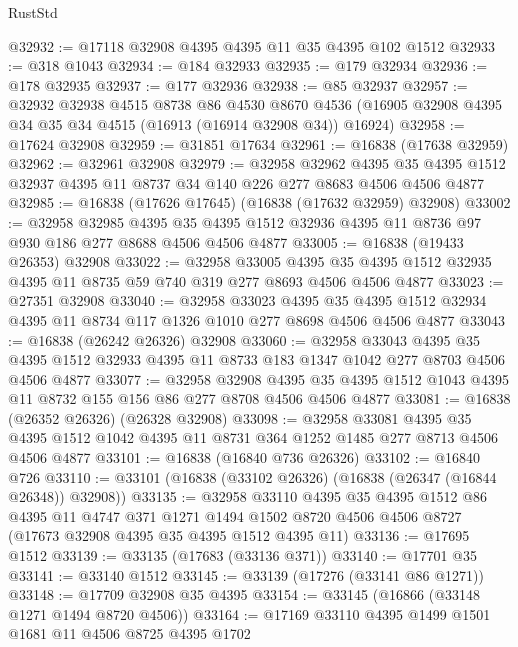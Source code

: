 \begin{lexlean}{RustStd}
\begin{coremodule}
@32932 := @17118 @32908 @4395 @4395 @11 @35 @4395 @102 @1512
@32933 := @318 @1043
@32934 := @184 @32933
@32935 := @179 @32934
@32936 := @178 @32935
@32937 := @177 @32936
@32938 := @85 @32937
@32957 := @32932
    @32938
    @4515
    @8738
    @86
    @4530
    @8670
    @4536
    (@16905 @32908 @4395 @34 @35 @34 @4515 (@16913 (@16914 @32908 @34)) @16924)
@32958 := @17624 @32908
@32959 := @31851 @17634
@32961 := @16838 (@17638 @32959)
@32962 := @32961 @32908
@32979 := @32958
    @32962
    @4395
    @35
    @4395
    @1512
    @32937
    @4395
    @11
    @8737
    @34
    @140
    @226
    @277
    @8683
    @4506
    @4506
    @4877
@32985 := @16838 (@17626 @17645) (@16838 (@17632 @32959) @32908)
@33002 := @32958
    @32985
    @4395
    @35
    @4395
    @1512
    @32936
    @4395
    @11
    @8736
    @97
    @930
    @186
    @277
    @8688
    @4506
    @4506
    @4877
@33005 := @16838 (@19433 @26353) @32908
@33022 := @32958
    @33005
    @4395
    @35
    @4395
    @1512
    @32935
    @4395
    @11
    @8735
    @59
    @740
    @319
    @277
    @8693
    @4506
    @4506
    @4877
@33023 := @27351 @32908
@33040 := @32958
    @33023
    @4395
    @35
    @4395
    @1512
    @32934
    @4395
    @11
    @8734
    @117
    @1326
    @1010
    @277
    @8698
    @4506
    @4506
    @4877
@33043 := @16838 (@26242 @26326) @32908
@33060 := @32958
    @33043
    @4395
    @35
    @4395
    @1512
    @32933
    @4395
    @11
    @8733
    @183
    @1347
    @1042
    @277
    @8703
    @4506
    @4506
    @4877
@33077 := @32958
    @32908
    @4395
    @35
    @4395
    @1512
    @1043
    @4395
    @11
    @8732
    @155
    @156
    @86
    @277
    @8708
    @4506
    @4506
    @4877
@33081 := @16838 (@26352 @26326) (@26328 @32908)
@33098 := @32958
    @33081
    @4395
    @35
    @4395
    @1512
    @1042
    @4395
    @11
    @8731
    @364
    @1252
    @1485
    @277
    @8713
    @4506
    @4506
    @4877
@33101 := @16838 (@16840 @736 @26326)
@33102 := @16840 @726
@33110 := @33101 (@16838 (@33102 @26326) (@16838 (@26347 (@16844 @26348)) @32908))
@33135 := @32958
    @33110
    @4395
    @35
    @4395
    @1512
    @86
    @4395
    @11
    @4747
    @371
    @1271
    @1494
    @1502
    @8720
    @4506
    @4506
    @8727
    (@17673 @32908 @4395 @35 @4395 @1512 @4395 @11)
@33136 := @17695 @1512
@33139 := @33135 (@17683 (@33136 @371))
@33140 := @17701 @35
@33141 := @33140 @1512
@33145 := @33139 (@17276 (@33141 @86 @1271))
@33148 := @17709 @32908 @35 @4395
@33154 := @33145 (@16866 (@33148 @1271 @1494 @8720 @4506))
@33164 := @17169 @33110 @4395 @1499 @1501 @1681 @11 @4506 @8725 @4395 @1702

\end{coremodule}
\end{lexlean}

